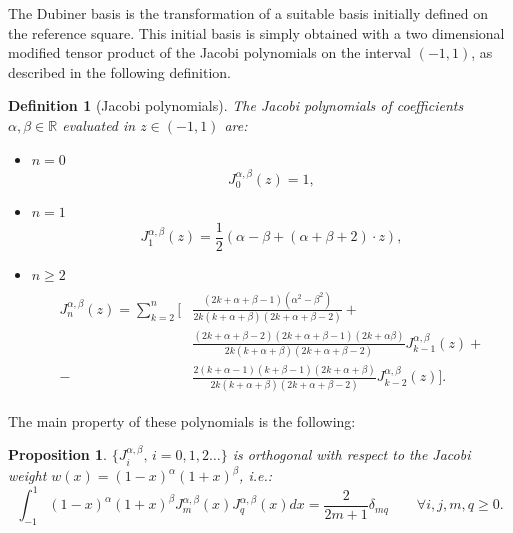 \documentclass[a4paper,11pt]{article}
\newtheorem{definition}{Definition}
\newtheorem{prop}{Proposition}
\begin{document}
    \noindent The Dubiner basis is the transformation of a suitable basis initially defined on the reference square. This initial basis is simply obtained with a two dimensional modified tensor product of the Jacobi polynomials on the interval $(-1,1)$, as described in the following definition. \\

    \begin{definition}[Jacobi polynomials]\label{jacobi}
    The Jacobi polynomials of coefficients $\alpha,\beta \in \mathbb{R}$ evaluated in $z\in (-1,1)$ are:
    \begin{itemize}[label=\textendash]
    \item $n=0$
    \begin{equation*}
    J_0^{\alpha,\beta}(z)=1,
    \end{equation*}
    \item $n=1$
    \begin{equation*}
    J_1^{\alpha,\beta}(z)=\frac{1}{2}(\alpha-\beta+(\alpha+\beta+2)\cdot z),
    \end{equation*}
    \item $n\ge2$
    \newline
    \begin{equation*}
    \begin{gathered}
    \begin{aligned}
    J_n^{\alpha,\beta}(z)=\sum_{k=2}^{n} \Big[&\frac{(2k+\alpha+\beta-1)(\alpha^{2}-\beta^{2})}{2k(k+\alpha+\beta)(2k+\alpha+\beta-2)}+ \\ &\frac{(2k+\alpha+\beta-2)(2k+\alpha+\beta-1)(2k+\alpha \beta)}{2k(k+\alpha+\beta)(2k+\alpha+\beta-2)} J_{k-1}^{\alpha,\beta}(z) +
    \\-&\frac{2(k+\alpha-1)(k+\beta-1)(2k+\alpha+\beta)}{2k(k+\alpha+\beta)(2k+\alpha+\beta-2)} J_{k-2}^{\alpha,\beta}(z) \Big].
    \end{aligned}
    \end{gathered}
    \end{equation*}
    \end{itemize}
    \end{definition}
    \vspace{5mm}
    \noindent The main property of these polynomials is the following:
    \begin{prop}\label{prop1}
    $\{J_i^{\alpha,\beta}, \, i=0,1,2 \dots\}$ is orthogonal with respect to the Jacobi weight $w(x)=(1-x)^\alpha(1+x)^\beta$, i.e.:
    \begin{equation*}
    \int_{-1}^{1}{(1-x)^\alpha(1+x)^\beta J_m^{\alpha,\beta}(x) J_q^{\alpha,\beta}(x)dx}=\frac{2}{2m+1} \delta_{mq} \qquad \forall i,j,m,q \geq 0.
    \end{equation*}
    \end{prop}
    
\end{document}
